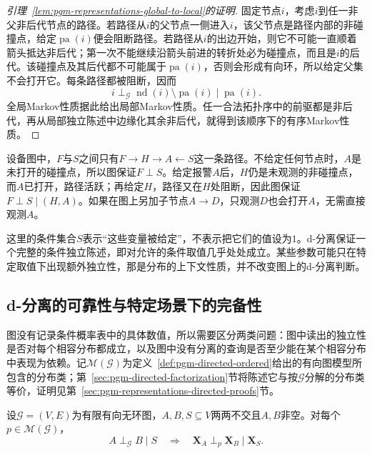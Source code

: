 \begin{proof}[引理~\ref{lem:pgm-representations-global-to-local}的证明]
固定节点$i$，考虑$i$到任一非父非后代节点的路径。若路径从$i$的父节点一侧进入$i$，该父节点是路径内部的非碰撞点，给定$\operatorname{pa}(i)$便会阻断路径。若路径从$i$的出边开始，则它不可能一直顺着箭头抵达非后代；第一次不能继续沿箭头前进的转折处必为碰撞点，而且是$i$的后代。该碰撞点及其后代都不可能属于$\operatorname{pa}(i)$，否则会形成有向环，所以给定父集不会打开它。每条路径都被阻断，因而
\[
  i\perp_{\mathcal G}
  \operatorname{nd}(i)\setminus\operatorname{pa}(i)
  \mid\operatorname{pa}(i).
\]
全局Markov性质据此给出局部Markov性质。任一合法拓扑序中的前驱都是非后代，再从局部独立陈述中边缘化其余非后代，就得到该顺序下的有序Markov性质。
\end{proof}

设备图中，$F$与$S$之间只有$F\to H\to A\leftarrow S$这一条路径。不给定任何节点时，$A$是未打开的碰撞点，所以图保证$F\perp S$。给定报警$A$后，$H$仍是未观测的非碰撞点，而$A$已打开，路径活跃；再给定$H$，路径又在$H$处阻断，因此图保证$F\perp S\mid(H,A)$。如果在图上另加子节点$A\to D$，只观测$D$也会打开$A$，无需直接观测$A$。

这里的条件集合$S$表示“这些变量被给定”，不表示把它们的值设为$1$。d-分离保证一个完整的条件独立陈述，即对允许的条件取值几乎处处成立。某些参数可能只在特定取值下出现额外独立性，那是分布的上下文性质，并不改变图上的d-分离判断。

\subsection{d-分离的可靠性与特定场景下的完备性}
\label{sec:pgm-directed-sound-complete}

图没有记录条件概率表中的具体数值，所以需要区分两类问题：图中读出的独立性是否对每个相容分布都成立，以及图中没有分离的查询是否至少能在某个相容分布中表现为依赖。记$\mathcal{M}(\mathcal{G})$为定义~\ref{def:pgm-directed-ordered}给出的有向图模型所包含的分布类；第~\ref{sec:pgm-directed-factorization}节将陈述它与按$\mathcal{G}$分解的分布类等价，证明见第~\ref{sec:pgm-representations-directed-proofs}节。

\begin{theorem}[d-分离的可靠性]
  \label{thm:pgm-directed-soundness}
  设$\mathcal{G}=(V,E)$为有限有向无环图，$A,B,S\subseteq V$两两不交且$A,B$非空。对每个$p\in\mathcal{M}(\mathcal{G})$，
  \begin{equation}
    A\perp_{\mathcal{G}}B\mid S
    \quad\Longrightarrow\quad
    \bm{X}_A\perp_p\bm{X}_B\mid\bm{X}_S.
    \label{eq:pgm-directed-soundness}
  \end{equation}
\end{theorem}

